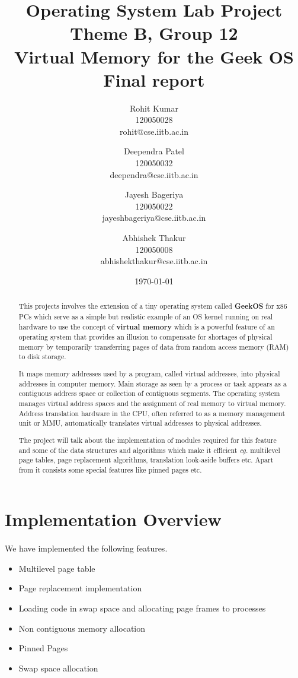 \documentclass[11pt]{article}
\title{\textbf{Operating System Lab Project \\ 
	Theme B, Group 12 \\
    Virtual Memory for the Geek OS \\
    Final report
	 }}
\author{Rohit Kumar \\ 120050028 \\ rohit@cse.iitb.ac.in
		\and 
		Deependra Patel \\ 120050032 \\ deependra@cse.iitb.ac.in
		\and
		Jayesh Bageriya \\ 120050022 \\ jayeshbageriya@cse.iitb.ac.in
        \\
		\and 
		Abhishek Thakur \\ 120050008 \\ abhishekthakur@cse.iitb.ac.in
		}
\date{\today}
\begin{document}
\maketitle


\begin{abstract}

This projects involves the extension of a tiny operating system called \textbf{GeekOS} for x86 PCs which serve as a simple but realistic example of an OS kernel running on real hardware to use the concept of \textbf{virtual memory} which is a powerful feature of an operating system that provides an illusion to compensate for shortages of physical memory by temporarily transferring pages of data from random access memory (RAM) to disk storage. 

It maps memory addresses used by a program, called virtual addresses, into physical addresses in computer memory. Main storage as seen by a process or task appears as a contiguous address space or collection of contiguous segments. The operating system manages virtual address spaces and the assignment of real memory to virtual memory. Address translation hardware in the CPU, often referred to as a memory management unit or MMU, automatically translates virtual addresses to physical addresses.

The project will talk about the implementation of modules required for this feature and some of the data structures and algorithms which make it efficient \textit{eg.} multilevel page tables, page replacement algorithms, translation look-aside buffers etc. Apart from it consists some special features like pinned pages etc.

\end{abstract}

\pagebreak

\section{Implementation Overview}
\paragraph{}
We have implemented the following features.
\begin{itemize}
\item Multilevel page table
\item Page replacement implementation
\item Loading code in swap space and allocating page frames to processes
\item Non contiguous memory allocation
\item Pinned Pages
\item Swap space allocation
\end{itemize}
\end{document}
